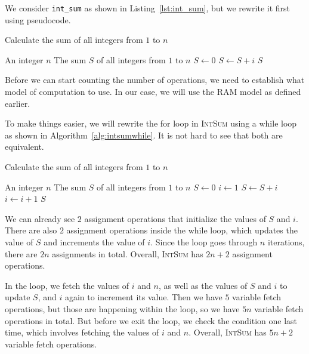 \begin{example}
\label{ex:countingops}

We consider \texttt{int\_sum} as shown in Listing~\ref{lst:int_sum}, but we rewrite it first using pseudocode.
\begin{algorithm}[H]
    \label{alg:intsum}
    \caption{Calculate the sum of all integers from $1$ to $n$}
    \begin{algorithmic}[1]
        \Require An integer $n$
        \Ensure The sum $S$ of all integers from $1$ to $n$
            \State $S \gets 0$
            \State $S \gets S+i$
            \EndFor
            \Return $S$
        \EndFunction
    \end{algorithmic}
\end{algorithm}

Before we can start counting the number of operations, we need to establish what model of computation to use. In our case, we will use the RAM model as defined earlier.

To make things easier, we will rewrite the for loop in \textsc{IntSum} using a while loop as shown in Algorithm~\ref{alg:intsumwhile}. It is not hard to see that both are equivalent.

\begin{algorithm}[H]
    \label{alg:intsumwhile}
    \caption{Calculate the sum of all integers from $1$ to $n$}
    \begin{algorithmic}[1]
        \Require An integer $n$
        \Ensure The sum $S$ of all integers from $1$ to $n$
            \State $S \gets 0$
            \State $i \gets 1$
            \State $S \gets S+i$
            \State $i \gets i+1$
            \EndWhile
            \Return $S$
        \EndFunction
    \end{algorithmic}
\end{algorithm}

We can already see $2$ assignment operations that initialize the values of $S$ and $i$. There are also $2$ assignment operations inside the while loop, which updates the value of $S$ and increments the value of $i$. Since the loop goes through $n$ iterations, there are $2n$ assignments in total. Overall, \textsc{IntSum} has $2n+2$ assignment operations.

In the loop, we fetch the values of $i$ and $n$, as well as the values of $S$ and $i$ to update $S$, and $i$ again to increment its value. Then we have $5$ variable fetch operations, but those are happening within the loop, so we have $5n$ variable fetch operations in total. But before we exit the loop, we check the condition one last time, which involves fetching the values of $i$ and $n$. Overall, \textsc{IntSum} has $5n+2$ variable fetch operations.


\end{example}
